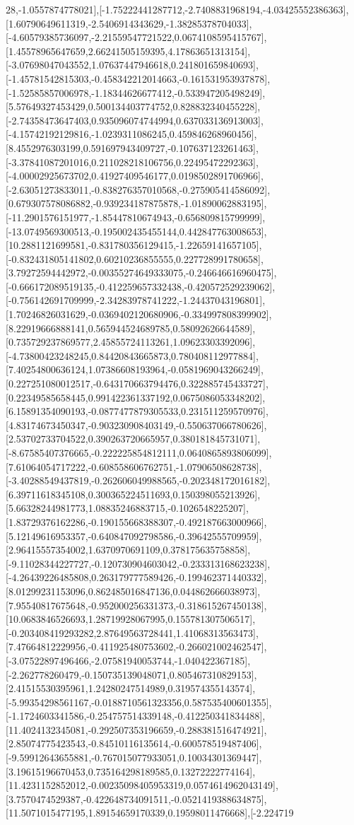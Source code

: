 \documentclass{article}
\begin{document}
28,-1.0557874778021],[-1.75222441287712,-2.7408831968194,-4.03425552386363],[1.60790649611319,-2.5406914343629,-1.38285378704033],[-4.60579385736097,-2.21559547721522,0.0674108595415767],[1.45578965647659,2.66241505159395,4.17863651313154],[-3.07698047043552,1.07637447946618,0.241801659840693],[-1.45781542815303,-0.458342212014663,-0.161531953937878],[-1.52585857006978,-1.18344626677412,-0.533947205498249],[5.57649327453429,0.500134403774752,0.828832340455228],[-2.74358473647403,0.935096074744994,0.637033136913003],[-4.15742192129816,-1.0239311086245,0.459846268960456],[8.4552976303199,0.591697943409727,-0.107637123261463],[-3.37841087201016,0.211028218106756,0.22495472292363],[-4.00002925673702,0.41927409546177,0.0198502891706966],[-2.63051273833011,-0.838276357010568,-0.275905414586092],[0.679307578086882,-0.939234187875878,-1.01890062883195],[-11.2901576151977,-1.85447810674943,-0.656809815799999],[-13.0749569300513,-0.195002435455144,0.442847763008653],[10.2881121699581,-0.831780356129415,-1.22659141657105],[-0.832431805141802,0.60210236855555,0.227728991780658],[3.79272594442972,-0.00355274649333075,-0.246646616960475],[-0.666172089519135,-0.412259657332438,-0.420572529239062],[-0.756142691709999,-2.34283978741222,-1.24437043196801],[1.70246826031629,-0.0369402120680906,-0.334997808399902],[8.22919666888141,0.565944524689785,0.58092626644589],[0.735729237869577,2.45855724113261,1.09623303392096],[-4.73800423248245,0.84420843665873,0.780408112977884],[7.40254800636124,1.07386608193964,-0.0581969043266249],[0.227251080012517,-0.643170663794476,0.322885745433727],[0.22349585658445,0.991422361337192,0.0675086053348202],[6.15891354090193,-0.0877477879305533,0.231511259570976],[4.83174673450347,-0.903230908403149,-0.550637066780626],[2.53702733704522,0.390263720665957,0.380181845731071],[-8.67585407376665,-0.222225854812111,0.0640865893806099],[7.61064054717222,-0.608558606762751,-1.07906508628738],[-3.40288549437819,-0.262606049988565,-0.202348172016182],[6.39711618345108,0.300365224511693,0.150398055213926],[5.66328244981773,1.08835246883715,-0.1026548225207],[1.83729376162286,-0.190155668388307,-0.492187663000966],[5.12149616953357,-0.640847092798586,-0.39642555709959],[2.96415557354002,1.6370970691109,0.378175635758858],[-9.11028344227727,-0.120730904603042,-0.233313168623238],[-4.26439226485808,0.263179777589426,-0.199462371440332],[8.01299231153096,0.862485016847136,0.044862666038973],[7.95540817675648,-0.952000256331373,-0.318615267450138],[10.0683846526693,1.28719928067995,0.155781307506517],[-0.203408419293282,2.87649563728441,1.41068313563473],[7.47664812229956,-0.411925480753602,-0.266021002462547],[-3.07522897496466,-2.07581940053744,-1.040422367185],[-2.262778260479,-0.150735139048071,0.805467310829153],[2.41515530395961,1.24280247514989,0.319574355143574],[-5.99354298561167,-0.0188710561323356,0.587535400601355],[-1.1724603341586,-0.254757514339148,-0.412250341834488],[11.4024132345081,-0.292507353196659,-0.288381516474921],[2.85074775423543,-0.84510116135614,-0.600578519487406],[-9.59912643655881,-0.767015077933051,0.10034301369447],[3.19615196670453,0.735164298189585,0.13272222774164],[11.4231152852012,-0.00235098405953319,0.0574614962043149],[3.7570474529387,-0.422648734091511,-0.0521419388634875],[11.5071015477195,1.89154659170339,0.19598011476668],[-2.224719
\end{document}
